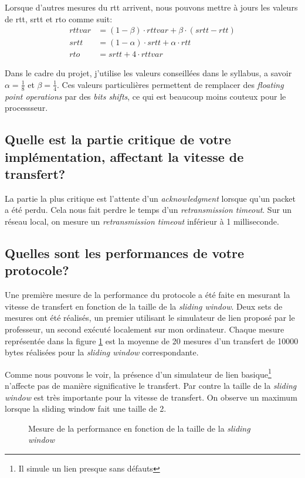 \documentclass[10pt,a4paper]{article}
\begin{document}
Lorsque d'autres mesures du rtt arrivent, nous pouvons mettre à jours les valeurs de rtt, srtt et rto comme suit:
\begin{align*}
	rttvar &= (1-\beta) \cdot rttvar + \beta \cdot (srtt - rtt) \\
	srtt &= (1-\alpha) \cdot srtt + \alpha \cdot rtt \\
	rto &= srtt + 4 \cdot rttvar
\end{align*}

Dans le cadre du projet, j'utilise les valeurs conseillées dans le syllabus, a savoir $\alpha = \frac{1}{8}$ et $\beta = \frac{1}{4}$. Ces valeurs particulières permettent de remplacer des \textit{floating point operations} par des \textit{bits shifts}, ce qui est beaucoup moins couteux pour le processseur.

\subsection{Quelle est la partie critique de votre implémentation, affectant la vitesse de transfert?}
La partie la plus critique est l'attente d'un \textit{acknowledgment} lorsque qu'un packet a été perdu. Cela nous fait perdre le temps d'un \textit{retransmission timeout}. Sur un réseau local, on mesure un \textit{retransmission timeout} inférieur à 1 milliseconde.


\subsection{Quelles sont les performances de votre protocole?}

Une première mesure de la performance du protocole a été faite en mesurant la vitesse de transfert en fonction de la taille de la \textit{sliding window}. Deux sets de mesures ont été réalisés, un premier utilisant le simulateur de lien proposé par le professeur, un second exécuté localement sur mon ordinateur. Chaque mesure représentée dans la figure \ref{fig:perf} est la moyenne de 20 mesures d'un transfert de 10000 bytes réalisées pour la \textit{sliding window} correspondante.

Comme nous pouvons le voir, la présence d'un simulateur de lien basique\footnote{Il simule un lien presque sans défauts} n'affecte pas de manière significative le transfert. Par contre la taille de la \textit{sliding window} est très importante pour la vitesse de transfert. On observe un maximum lorsque la sliding window fait une taille de 2.

\begin{figure}[!h]
\centering
{}
\caption{Mesure de la performance en fonction de la taille de la \textit{sliding window}}
\label{fig:perf}
\end{figure}
\end{document}

